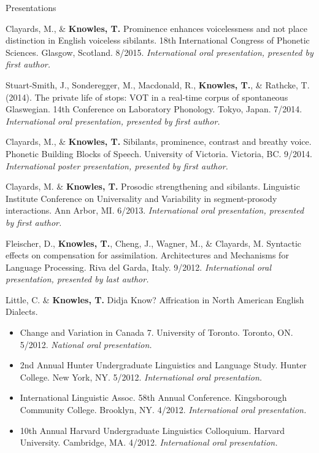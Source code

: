 \documentclass{resume} %
\begin{document}
\begin{rSection}{Presentations}
\begin{etaremune}
\item Clayards, M., \& {\bf Knowles, T.} Prominence enhances voicelessness and not place distinction in English voiceless sibilants. 18th International Congress of Phonetic Sciences. Glasgow, Scotland. 8/2015. \emph{International oral presentation, presented by first author.}
	
\item Stuart-Smith, J., Sonderegger, M., Macdonald, R., {\bf Knowles, T.}, \& Rathcke, T. (2014). The private life of stops: VOT in a real-time corpus of spontaneous Glaswegian. 14th Conference on Laboratory Phonology. Tokyo, Japan. 7/2014. \emph{International oral presentation, presented by first author.}
	
\item Clayards, M., \& {\bf Knowles, T.} Sibilants, prominence, contrast and breathy voice. Phonetic Building Blocks of Speech. University of Victoria. Victoria, BC. 9/2014. \emph{International poster presentation, presented by first author.}
	
	
\item Clayards, M. \& {\bf Knowles, T.} Prosodic strengthening and sibilants. Linguistic Institute Conference on Universality and Variability in segment-prosody interactions. Ann Arbor, MI. 6/2013. \emph{International oral presentation, presented by first author.}
	
\item Fleischer, D., {\bf Knowles, T.}, Cheng, J., Wagner, M., \& Clayards, M. Syntactic effects on compensation for assimilation. Architectures and Mechanisms for Language Processing. Riva del Garda, Italy. 9/2012. \emph{International oral presentation, presented by last author.}
	
\item Little, C. \& {\bf Knowles, T.} Didja Know? Affrication in North American English Dialects.
	\begin{itemize}
				\renewcommand\labelitemi{$\cdot$}
		\item Change and Variation in Canada 7. University of Toronto. Toronto, ON. 5/2012. \emph{National oral presentation.}
		\item 2nd Annual Hunter Undergraduate Linguistics and Language Study. Hunter College. New York, NY. 5/2012. \emph{International oral presentation.}
		\item International Linguistic Assoc. 58th Annual Conference. Kingsborough Community College. Brooklyn, NY. 4/2012. \emph{International oral presentation.}
		\item 10th Annual Harvard Undergraduate Linguistics Colloquium. Harvard University. Cambridge, MA. 4/2012. \emph{International oral presentation.}
	\end{itemize}
	

\end{etaremune}
\end{rSection}
\end{document}
